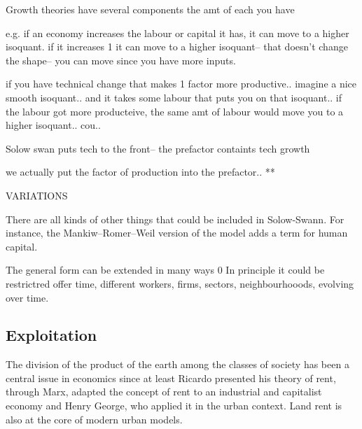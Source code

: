 Growth theories have several components
the amt of each you have

e.g. if an economy increases the labour or capital it has, it can move to a higher isoquant. if it increases 1 it can move to a higher isoquant-- that doesn't change the shape-- you can move since you have more inputs.

if you have technical change that makes 1 factor more productive.. imagine a nice smooth isoquant.. and it takes some labour that puts you on that isoquant.. if the labour got more producteive, the same amt of labour would move you to a higher isoquant.. cou..


Solow swan puts tech to the front-- the prefactor containts tech growth

we actually put the factor of production into the prefactor.. ** 





VARIATIONS

There are all kinds of other things that could be included in Solow-Swann. For instance, the Mankiw–Romer–Weil version of the model adds a term for human capital.

The general form can be extended in many ways 0 
 In principle it could be restrictred offer time, different workers, firms, sectors, neighbourhooods, evolving over time.


\subsection{Exploitation}\label{Sec:Exploitation: A Note}
The division of the product of the earth among the classes of society has been a central issue in economics since at least Ricardo presented his theory of  rent, through Marx, adapted the concept of rent to an industrial and capitalist economy and Henry George, who applied it in the urban context. Land rent is also at the core of modern urban models. 

